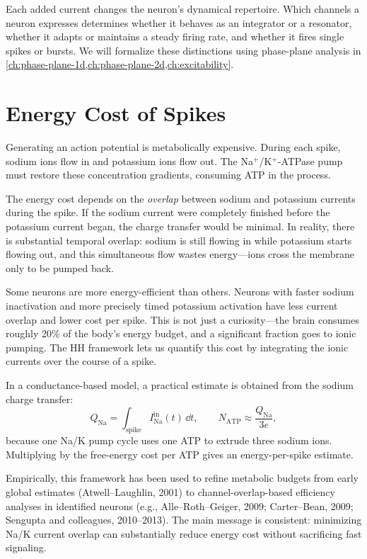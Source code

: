 Each added current changes the neuron's dynamical repertoire. Which channels a neuron expresses determines whether it behaves as an integrator or a resonator, whether it adapts or maintains a steady firing rate, and whether it fires single spikes or bursts. We will formalize these distinctions using phase-plane analysis in \cref{ch:phase-plane-1d,ch:phase-plane-2d,ch:excitability}.

\section{Energy Cost of Spikes}
\label{sec:energy-cost}

Generating an action potential is metabolically expensive. During each spike, sodium ions flow in and potassium ions flow out. The Na$^+$/K$^+$-ATPase pump must restore these concentration gradients, consuming ATP in the process.

The energy cost depends on the \emph{overlap} between sodium and potassium currents during the spike. If the sodium current were completely finished before the potassium current began, the charge transfer would be minimal. In reality, there is substantial temporal overlap: sodium is still flowing in while potassium starts flowing out, and this simultaneous flow wastes energy---ions cross the membrane only to be pumped back.

Some neurons are more energy-efficient than others. Neurons with faster sodium inactivation and more precisely timed potassium activation have less current overlap and lower cost per spike. This is not just a curiosity---the brain consumes roughly 20\% of the body's energy budget, and a significant fraction goes to ionic pumping. The HH framework lets us quantify this cost by integrating the ionic currents over the course of a spike.

In a conductance-based model, a practical estimate is obtained from the sodium charge transfer:
%
\begin{equation}
  Q_{\text{Na}} = \int_{\text{spike}} I_{\text{Na}}^{\text{in}}(t)\,\dd t,
  \qquad
  N_{\text{ATP}} \approx \frac{Q_{\text{Na}}}{3e},
  \label{eq:spike-atp}
\end{equation}
%
because one Na/K pump cycle uses one ATP to extrude three sodium ions. Multiplying by the free-energy cost per ATP gives an energy-per-spike estimate.

Empirically, this framework has been used to refine metabolic budgets from early global estimates (Atwell--Laughlin, 2001) to channel-overlap-based efficiency analyses in identified neurons (e.g., Alle--Roth--Geiger, 2009; Carter--Bean, 2009; Sengupta and colleagues, 2010--2013). The main message is consistent: minimizing Na/K current overlap can substantially reduce energy cost without sacrificing fast signaling.

